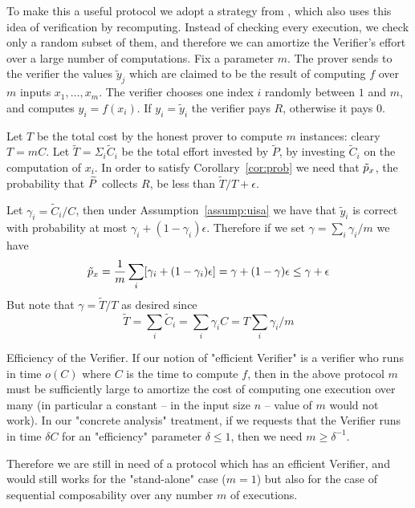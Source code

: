 To make this a useful protocol we adopt a strategy from  \cite{b08}, which also uses this idea of verification by recomputing. Instead of checking 
every execution, we check only a random subset of them, and therefore we can amortize the Verifier's effort over a large number of computations. 
Fix a parameter $m$. The prover sends to the verifier the values $\tilde{y}_j$ which are claimed to be the result of computing $f$ over $m$ inputs $x_1,\ldots,x_m$. 
The verifier chooses one index $i$ 
randomly between $1$ and $m$, and computes $y_i=f(x_i)$. If $y_i=\tilde{y}_i$ the verifier pays $R$, otherwise it pays $0$. 

Let $T$ be the total cost by the honest prover to compute $m$ instances: cleary $T=mC$. Let $\tilde{T}=\Sigma_i \tilde{C}_i$ be the total effort invested by $\tilde{P}$, by investing $\tilde{C}_i$ on the computation of $x_i$. 
In order to satisfy Corollary~\ref{cor:prob} we need that $\tilde{p}_x$, the probability that $\widetilde{P}$ collects $R$, be less than $\tilde{T}/T + \epsilon$. 

Let $\gamma_i = \tilde{C}_i/C$, then under Assumption~\ref{assump:uisa} we have that $\tilde{y}_i$ is correct with probability at most $\gamma_i+(1-\gamma_i)\epsilon$. Therefore if we set $\gamma = \sum_i \gamma_i/m$ we have 
$$ \tilde{p}_x = \frac{1}{m} \sum_i [\gamma_i+(1-\gamma_i)\epsilon] = \gamma + (1-\gamma) \epsilon \leq \gamma + \epsilon $$
But note that $\gamma=\tilde{T}/T$ as desired since
$$ \tilde{T} = \sum_i \tilde{C}_i = \sum_i \gamma_i C = T \sum_i \gamma_i/m $$

\medskip
\noindent
{\sc Efficiency of the Verifier.}
If our notion of "efficient Verifier" is a verifier who runs in time $o(C)$ where $C$ is the time to compute $f$, then in the above protocol $m$ must be sufficiently large to amortize the cost of computing one execution over many (in particular a constant -- in the input size $n$ -- value of $m$ would not work). In our "concrete analysis" treatment, if we requests that the Verifier runs in time $\delta C$ for an "efficiency" parameter $\delta \leq 1$, then we need $m \geq \delta^{-1}$. 

Therefore we are still in need of a protocol which has an efficient Verifier, and would still works for the "stand-alone" case ($m=1$) but also for the case
of sequential composability over any number $m$ of executions. 
